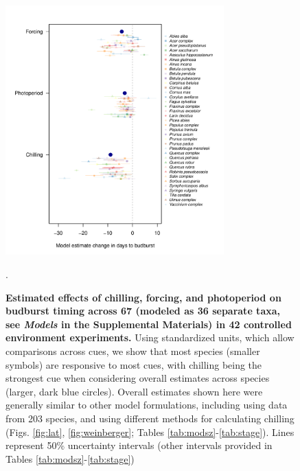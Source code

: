 \documentclass{article}
\newcommand{\R}[1]{\label{#1}\linelabel{#1}}
\begin{document}
\begin{figure}[h!]
\centering
\noindent \includegraphics[width=0.75\textwidth]{..//..//analyses/bb_analysis/figures/muplotspcompexprampfputah_z.pdf}
\caption{\textbf{Estimated effects of chilling, forcing, and photoperiod on budburst timing across 67 (modeled as 36 separate taxa, see \emph{Models} in the Supplemental Materials) in 42 controlled environment experiments\R{ee12}.} Using standardized units, which allow comparisons across cues, we show that most species (smaller symbols) are responsive to most cues, with chilling being the strongest cue when considering overall estimates across species (larger, dark blue circles). Overall estimates shown here were generally similar to other model formulations, including using data from 203 species, and using different methods for calculating chilling (Figs. \ref{fig:lat}, \ref{fig:weinberger}; Tables \ref{tab:modsz}-\ref{tab:stage}). Lines represent 50\% uncertainty intervals (other intervals provided in Tables \ref{tab:modsz}-\ref{tab:stage})}. %
\label{fig:mu}
\end{figure}

\newpage
\end{document}
